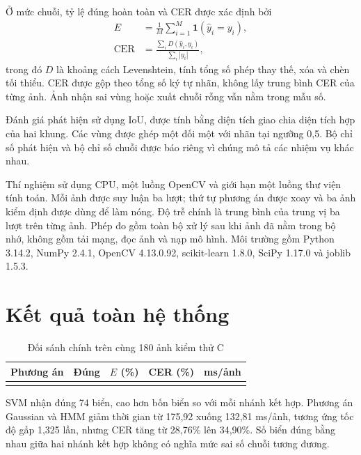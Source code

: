 Ở mức chuỗi, tỷ lệ đúng hoàn toàn và CER được xác định bởi
\begin{align}
E&=\frac{1}{M}\sum_{i=1}^{M}\mathbf{1}(\widehat y_i=y_i),\\
\operatorname{CER}&=\frac{\sum_i D(\widehat y_i,y_i)}{\sum_i|y_i|},
\end{align}
trong đó $D$ là khoảng cách Levenshtein, tính tổng số phép thay thế, xóa và chèn tối thiểu. CER được gộp theo tổng số ký tự nhãn, không lấy trung bình CER của từng ảnh. Ảnh nhận sai vùng hoặc xuất chuỗi rỗng vẫn nằm trong mẫu số.

Đánh giá phát hiện sử dụng IoU, được tính bằng diện tích giao chia diện tích hợp của hai khung. Các vùng được ghép một đối một với nhãn tại ngưỡng 0,5. Bộ chỉ số phát hiện và bộ chỉ số chuỗi được báo riêng vì chúng mô tả các nhiệm vụ khác nhau.

Thí nghiệm sử dụng CPU, một luồng OpenCV và giới hạn một luồng thư viện tính toán. Mỗi ảnh được suy luận ba lượt; thứ tự phương án được xoay và ba ảnh kiểm định được dùng để làm nóng. Độ trễ chính là trung bình của trung vị ba lượt trên từng ảnh. Phép đo gồm toàn bộ xử lý sau khi ảnh đã nằm trong bộ nhớ, không gồm tải mạng, đọc ảnh và nạp mô hình. Môi trường gồm Python 3.14.2, NumPy 2.4.1, OpenCV 4.13.0.92, scikit-learn 1.8.0, SciPy 1.17.0 và joblib 1.5.3.

\section{Kết quả toàn hệ thống}
\begin{table}[H]\centering
\caption{Đối sánh chính trên cùng 180 ảnh kiểm thử C}\label{tab:main}
\begin{tabularx}{\textwidth}{Y r r r r}
\toprule
Phương án & Đúng & $E$ (\%) & CER (\%) & ms/ảnh\\
\midrule
{}
\bottomrule
\end{tabularx}
\end{table}


SVM nhận đúng 74 biển, cao hơn bốn biển so với mỗi nhánh kết hợp. Phương án Gaussian và HMM giảm thời gian từ 175,92 xuống 132,81 ms/ảnh, tương ứng tốc độ gấp 1,325 lần, nhưng CER tăng từ 28,76\% lên 34,90\%. Số biển đúng bằng nhau giữa hai nhánh kết hợp không có nghĩa mức sai số chuỗi tương đương.

